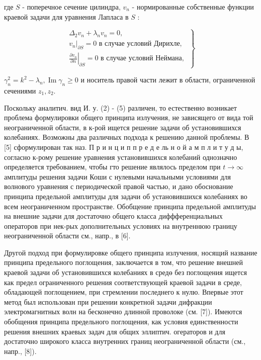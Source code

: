 \documentclass[10pt]{article}
\begin{document}
где $S$ - поперечное сечение цилиндра, $v_{n}$ - нормированные собственные функции краевой задачи для уравнения Лапласа в $S$ :



\[

\left.\begin{array}{c}

\Delta_{2} v_{n}+\lambda_{n} v_{n}=0, \\

\left.v_{n}\right|_{\partial S}=0 \text { в случае условий Дирихле, } \\

\left.\frac{\partial v_{n}}{\partial n}\right|_{\partial S}=0 \text { в случае условий Неймана, }

\end{array}\right\}

\]



$\gamma_{n}^{2}=k^{2}-\lambda_{n}, \operatorname{Im} \gamma_{n} \geqslant 0$ и носитель правой части лежит в области, ограниченной сечениями $z_{1}, z_{2}$.



Поскольку аналитич. вид И. у. (2) - (5) различен, то естественно возникает проблема формулировки общего принципа излучения, не зависящего от вида той неограниченной области, в к-рой ищется решение задачи об установившихся колебаниях. Возможны два различных подхода к решению данной проблемы. В [5] сформулирован так наз. П р и н ц и п п р е д е ль н о й а м п л и т у д ы, согласно к-рому решение уравнения установившихся колебаний однозначно определяется требованием, чтобы гто решение являлось пределом при $t \rightarrow \infty$ амплитуды решения задачи Коши с нулевыми начальными условиями для волнового уравнения с периодической правой частью, и дано обоснование принципа предельной амплитуды для задачи об установившихся колебаниях во всем неограниченном пространстве. Обобщение принципа предельной амплитуды на внешние задачи для достаточно общего класса диффференциальных операторов при нек-рых дополнительных условиях на внутреннюю границу неограниченной области см., напр., в [6].



Другой подход при формулировке общего принципа излучения, носящий название принципа предельного поглощения, заключается в том, что решение внешней краевой задачи об установившихся колебаниях в средө без поглощения ищется как предел ограниченного решения соответствующей краевой задачи в среде, обладающей поглощением, при стремлении последнего к нулю. Впервые этот метод был использован при решении конкретной задачи дифракции электромагнитных волн на бесконечно длинной проволоке (см. [7]). Имеются обобщения принципа предельного поглощения, как условия единственности решения внешних краевых задач для общих эллиптич. огераторов и для достаточно широкого класса внутренних границ неограниченной области (см., напр., [8]).
\end{document}
